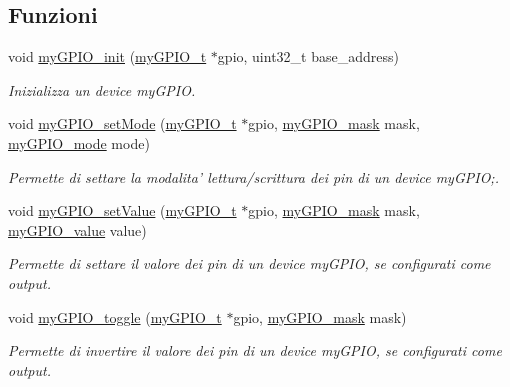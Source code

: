 \subsection*{Funzioni}
\begin{DoxyCompactItemize}
\item 
void \hyperlink{group__my_g_p_i_o_ga8fda7ca73b187baf256409423c25d725}{my\+G\+P\+I\+O\+\_\+init} (\hyperlink{structmy_g_p_i_o__t}{my\+G\+P\+I\+O\+\_\+t} $\ast$gpio, uint32\+\_\+t base\+\_\+address)
\begin{DoxyCompactList}\small\item\em Inizializza un device my\+G\+P\+I\+O. \end{DoxyCompactList}\item 
void \hyperlink{group__my_g_p_i_o_ga38a2ea04d07af50f7f570f0367594c8b}{my\+G\+P\+I\+O\+\_\+set\+Mode} (\hyperlink{structmy_g_p_i_o__t}{my\+G\+P\+I\+O\+\_\+t} $\ast$gpio, \hyperlink{group__my_g_p_i_o_ga402a0d20afc0cb7c25554b8b023f4253}{my\+G\+P\+I\+O\+\_\+mask} mask, \hyperlink{group__my_g_p_i_o_ga76b849f0e0c05e7f9161bdb33396f2b1}{my\+G\+P\+I\+O\+\_\+mode} mode)
\begin{DoxyCompactList}\small\item\em Permette di settare la modalita' lettura/scrittura dei pin di un device my\+G\+P\+I\+O;. \end{DoxyCompactList}\item 
void \hyperlink{group__my_g_p_i_o_gab742e68093ad4c90fe299b64fd6736ca}{my\+G\+P\+I\+O\+\_\+set\+Value} (\hyperlink{structmy_g_p_i_o__t}{my\+G\+P\+I\+O\+\_\+t} $\ast$gpio, \hyperlink{group__my_g_p_i_o_ga402a0d20afc0cb7c25554b8b023f4253}{my\+G\+P\+I\+O\+\_\+mask} mask, \hyperlink{group__my_g_p_i_o_gaf634fe4a0e1eab8da5000b72d6ad362b}{my\+G\+P\+I\+O\+\_\+value} value)
\begin{DoxyCompactList}\small\item\em Permette di settare il valore dei pin di un device my\+G\+P\+I\+O, se configurati come output. \end{DoxyCompactList}\item 
void \hyperlink{group__my_g_p_i_o_ga27ea411bf51a58fe48eb8c5036780b53}{my\+G\+P\+I\+O\+\_\+toggle} (\hyperlink{structmy_g_p_i_o__t}{my\+G\+P\+I\+O\+\_\+t} $\ast$gpio, \hyperlink{group__my_g_p_i_o_ga402a0d20afc0cb7c25554b8b023f4253}{my\+G\+P\+I\+O\+\_\+mask} mask)
\begin{DoxyCompactList}\small\item\em Permette di invertire il valore dei pin di un device my\+G\+P\+I\+O, se configurati come output. \end{DoxyCompactList}\item 

\end{DoxyCompactItemize}
